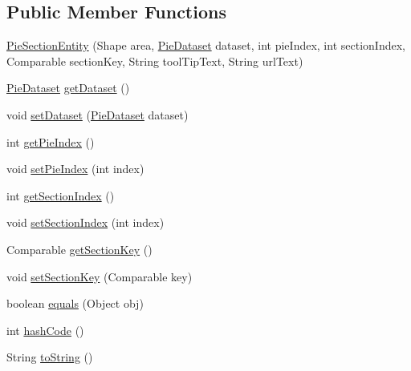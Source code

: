 \subsection*{Public Member Functions}
\begin{DoxyCompactItemize}
\item 
\mbox{\hyperlink{classorg_1_1jfree_1_1chart_1_1entity_1_1_pie_section_entity_adfa9305559347b945b22b3a23bf5c355}{Pie\+Section\+Entity}} (Shape area, \mbox{\hyperlink{interfaceorg_1_1jfree_1_1data_1_1general_1_1_pie_dataset}{Pie\+Dataset}} dataset, int pie\+Index, int section\+Index, Comparable section\+Key, String tool\+Tip\+Text, String url\+Text)
\item 
\mbox{\hyperlink{interfaceorg_1_1jfree_1_1data_1_1general_1_1_pie_dataset}{Pie\+Dataset}} \mbox{\hyperlink{classorg_1_1jfree_1_1chart_1_1entity_1_1_pie_section_entity_af99237b3035f9f95772f724f96a3c14d}{get\+Dataset}} ()
\item 
void \mbox{\hyperlink{classorg_1_1jfree_1_1chart_1_1entity_1_1_pie_section_entity_aac16216f75526ce76572bb6c4ea9d5b9}{set\+Dataset}} (\mbox{\hyperlink{interfaceorg_1_1jfree_1_1data_1_1general_1_1_pie_dataset}{Pie\+Dataset}} dataset)
\item 
int \mbox{\hyperlink{classorg_1_1jfree_1_1chart_1_1entity_1_1_pie_section_entity_a07ea4f8cc4f44a495c95ae2e594bc5ff}{get\+Pie\+Index}} ()
\item 
void \mbox{\hyperlink{classorg_1_1jfree_1_1chart_1_1entity_1_1_pie_section_entity_a2c0d0c8d6eac5eddfef4a343ddf577a5}{set\+Pie\+Index}} (int index)
\item 
int \mbox{\hyperlink{classorg_1_1jfree_1_1chart_1_1entity_1_1_pie_section_entity_a86999ad37a7b6db83350f9b1f6abd8a7}{get\+Section\+Index}} ()
\item 
void \mbox{\hyperlink{classorg_1_1jfree_1_1chart_1_1entity_1_1_pie_section_entity_a006645185ce6fea9502b49b823431307}{set\+Section\+Index}} (int index)
\item 
Comparable \mbox{\hyperlink{classorg_1_1jfree_1_1chart_1_1entity_1_1_pie_section_entity_ac1c641ae979fd28641726ab3a93bd443}{get\+Section\+Key}} ()
\item 
void \mbox{\hyperlink{classorg_1_1jfree_1_1chart_1_1entity_1_1_pie_section_entity_af1335031bd29163a4d65ee4e02a044cd}{set\+Section\+Key}} (Comparable key)
\item 
boolean \mbox{\hyperlink{classorg_1_1jfree_1_1chart_1_1entity_1_1_pie_section_entity_addbf8dbafc72bc979c49c10b178b07b6}{equals}} (Object obj)
\item 
int \mbox{\hyperlink{classorg_1_1jfree_1_1chart_1_1entity_1_1_pie_section_entity_a16f9329941bd0c821bbdae7677e61d90}{hash\+Code}} ()
\item 
String \mbox{\hyperlink{classorg_1_1jfree_1_1chart_1_1entity_1_1_pie_section_entity_a754273c9016db7410eb71827df1a1a75}{to\+String}} ()
\end{DoxyCompactItemize}



